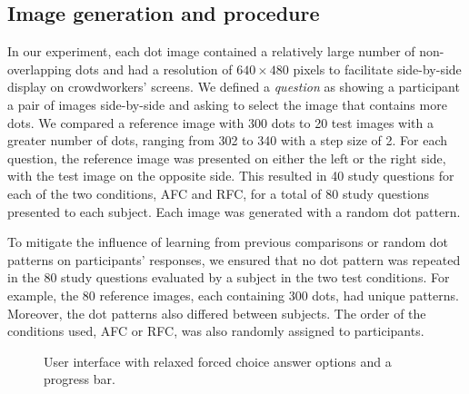 \documentclass[a4paper,conference]{IEEEtran}
\begin{document}
\subsection{Image generation and procedure}

In our experiment, each dot image contained a relatively large number of non-overlapping dots and had a resolution of $640\times480$ pixels to facilitate side-by-side display on crowdworkers' screens. We defined a \textit{question} as showing a participant a pair of images side-by-side and asking to select the image that contains more dots. We compared a reference image with 300 dots to 20 test images with a greater number of dots, ranging from 302 to 340 with a step size of 2. For each question, the reference image was presented on either the left or the right side, with the test image on the opposite side. This resulted in 40 study questions for each of the two conditions, AFC and RFC, for a total of 80 study questions presented to each subject.  Each image was generated with a random dot pattern.

To mitigate the influence of learning from previous comparisons or random dot patterns on participants' responses, we ensured that no dot pattern was repeated in the 80 study questions evaluated by a subject in the two test conditions. For example, the 80 reference images, each containing 300 dots, had unique patterns. Moreover, the dot patterns also differed between subjects. The order of the conditions used, AFC or RFC, was also randomly assigned to participants. 

\begin{figure}[t!]
\centering
\begin{minipage}{0.98\linewidth}
\end{minipage}
\caption{User interface with relaxed forced choice answer options and a progress bar.}
\label{fig:interface}
\end{figure}

\end{document}
